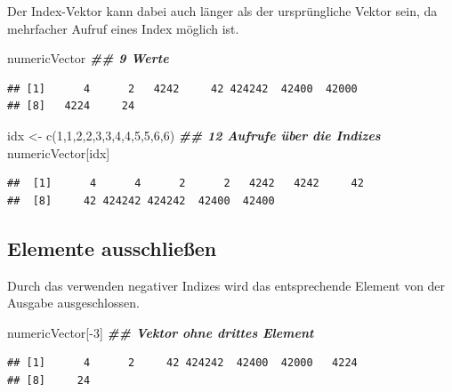 \documentclass[
]{book}
\newenvironment{Shaded}{\begin{snugshade}}{\end{snugshade}}
\newcommand{\DecValTok}[1]{\textcolor[rgb]{0.00,0.00,0.81}{#1}}
\newcommand{\DocumentationTok}[1]{\textcolor[rgb]{0.56,0.35,0.01}{\textbf{\textit{#1}}}}
\newcommand{\FunctionTok}[1]{\textcolor[rgb]{0.00,0.00,0.00}{#1}}
\newcommand{\NormalTok}[1]{#1}
\newcommand{\OtherTok}[1]{\textcolor[rgb]{0.56,0.35,0.01}{#1}}
\newcommand{\SpecialCharTok}[1]{\textcolor[rgb]{0.00,0.00,0.00}{#1}}
\begin{document}
Der Index-Vektor kann dabei auch länger als der ursprüngliche Vektor sein, da mehrfacher Aufruf eines Index möglich ist.

\begin{Shaded}
\begin{Highlighting}[]
\NormalTok{numericVector }\DocumentationTok{\#\# 9 Werte}
\end{Highlighting}
\end{Shaded}

\begin{verbatim}
## [1]      4      2   4242     42 424242  42400  42000
## [8]   4224     24
\end{verbatim}

\begin{Shaded}
\begin{Highlighting}[]
\NormalTok{idx }\OtherTok{\textless{}{-}} \FunctionTok{c}\NormalTok{(}\DecValTok{1}\NormalTok{,}\DecValTok{1}\NormalTok{,}\DecValTok{2}\NormalTok{,}\DecValTok{2}\NormalTok{,}\DecValTok{3}\NormalTok{,}\DecValTok{3}\NormalTok{,}\DecValTok{4}\NormalTok{,}\DecValTok{4}\NormalTok{,}\DecValTok{5}\NormalTok{,}\DecValTok{5}\NormalTok{,}\DecValTok{6}\NormalTok{,}\DecValTok{6}\NormalTok{)}
\DocumentationTok{\#\# 12 Aufrufe über die Indizes}
\NormalTok{numericVector[idx]}
\end{Highlighting}
\end{Shaded}

\begin{verbatim}
##  [1]      4      4      2      2   4242   4242     42
##  [8]     42 424242 424242  42400  42400
\end{verbatim}

\hypertarget{elemente-ausschlieuxdfen}{%
\subsection{Elemente ausschließen}\label{elemente-ausschlieuxdfen}}

Durch das verwenden negativer Indizes wird das entsprechende Element von der Ausgabe ausgeschlossen.

\begin{Shaded}
\begin{Highlighting}[]
\NormalTok{numericVector[}\SpecialCharTok{{-}}\DecValTok{3}\NormalTok{] }\DocumentationTok{\#\# Vektor ohne drittes Element}
\end{Highlighting}
\end{Shaded}

\begin{verbatim}
## [1]      4      2     42 424242  42400  42000   4224
## [8]     24
\end{verbatim}
\end{document}
